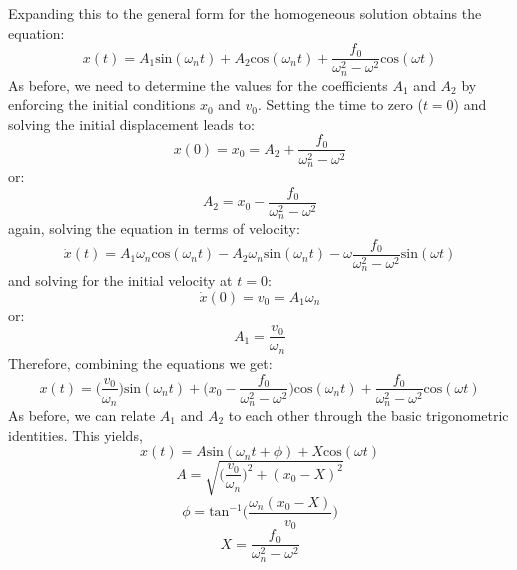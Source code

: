 \documentclass[12pt,letter]{article}
\numberwithin{ex}{section} %
\numberwithin{re}{section} %
\numberwithin{pr}{section} %
\begin{document}
			Expanding this to the general form for the homogeneous solution obtains the equation:
			\begin{equation}
				x(t) = A_1\text{sin}(\omega_n t) + A_2\text{cos}(\omega_n t) + \frac{f_0}{\omega_n^2-\omega^2}\text{cos}(\omega t)
			\end{equation}				
			As before, we need to determine the values for the coefficients $A_1$ and $A_2$ by enforcing the initial conditions $x_0$ and $v_0$. Setting the time to zero ($t=0$) and solving the initial displacement leads to:
			\begin{equation}
				x(0) = x_0 = A_2 + \frac{f_0}{\omega_n^2-\omega^2}
			\end{equation}				
			or:
			\begin{equation}
				A_2 = x_0-\frac{f_0}{\omega_n^2-\omega^2}
			\end{equation}	
			again, solving the equation in terms of velocity:
			\begin{equation}
				\dot{x}(t) = A_1\omega_n\text{cos}(\omega_n t) - A_2 \omega_n \text{sin}(\omega_n t) - \omega \frac{f_0}{\omega_n^2-\omega^2}\text{sin}(\omega t)
			\end{equation}	
			and solving for the initial velocity at $t=0$:
			\begin{equation}
				\dot{x}(0) = v_0 =  A_1 \omega_n
			\end{equation}				
			or:
			\begin{equation}
				A_1 = \frac{v_0}{\omega_n}
			\end{equation}				
			Therefore, combining the equations we get:
			\begin{equation}
				x(t) = \Big(\frac{v_0}{\omega_n}\Big)\text{sin}(\omega_n t) + \Big(x_0-\frac{f_0}{\omega_n^2-\omega^2}\Big)\text{cos}(\omega_n t) + \frac{f_0}{\omega_n^2-\omega^2}\text{cos}(\omega t)
			\end{equation}	
			As before, we can relate $A_1$ and $A_2$ to each other through the basic trigonometric identities. This yields, 
			\begin{equation}
				x(t) = A\text{sin}(\omega_n t + \phi) + X\text{cos}(\omega t) 
			\end{equation}				
			\begin{equation}
				A = \sqrt{\bigg(\frac{v_0}{\omega_n}\bigg)^2+(x_0-X)^2}
			\end{equation}				
			\begin{equation}
				\phi = \text{tan}^{-1}\bigg(\frac{\omega_n(x_0-X)}{v_0}\bigg)
			\end{equation}				
			\begin{equation}
				X = \frac{f_0}{\omega_n^2-\omega^2}
			\end{equation}				
			
\end{document}

